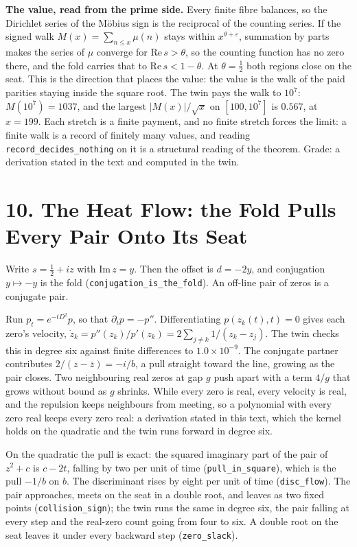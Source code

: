 \documentclass[10pt,twocolumn]{article}
\begin{document}
\textbf{The value, read from the prime side.} Every finite fibre
balances, so the Dirichlet series of the Möbius sign is the reciprocal
of the counting series. If the signed walk \(M(x)=\sum_{n\le x}\mu(n)\)
stays within \(x^{\theta+\varepsilon}\), summation by parts makes the
series of \(\mu\) converge for \(\mathrm{Re}\,s>\theta\), so the
counting function has no zero there, and the fold carries that to
\(\mathrm{Re}\,s<1-\theta\). At \(\theta=\tfrac12\) both regions close
on the seat. This is the direction that places the value: the value is
the walk of the paid parities staying inside the square root. The twin
pays the walk to \(10^7\): \(M(10^7)=1037\), and the largest
\(|M(x)|/\sqrt x\) on \([100,10^7]\) is \(0.567\), at \(x=199\). Each
stretch is a finite payment, and no finite stretch forces the limit: a
finite walk is a record of finitely many values, and reading
\texttt{record\_\allowbreak{}decides\_\allowbreak{}nothing} on it is a structural reading of the
theorem. Grade: a derivation stated in the text and computed in the
twin.

\hypertarget{the-heat-flow-the-fold-pulls-every-pair-onto-its-seat}{%
\section{10. The Heat Flow: the Fold Pulls Every Pair Onto Its
Seat}\label{the-heat-flow-the-fold-pulls-every-pair-onto-its-seat}}

Write \(s=\tfrac12+iz\) with \(\mathrm{Im}\,z=y\). Then the offset is
\(d=-2y\), and conjugation \(y\mapsto-y\) is the fold
(\texttt{conjugation\_\allowbreak{}is\_\allowbreak{}the\_\allowbreak{}fold}). An off-line pair of zeros is a
conjugate pair.

Run \(p_t=e^{-tD^2}p\), so that \(\partial_tp=-p''\). Differentiating
\(p(z_k(t),t)=0\) gives each zero's velocity,
\(\dot z_k=p''(z_k)/p'(z_k)=2\sum_{j\ne k}1/(z_k-z_j)\). The twin checks
this in degree six against finite differences to \(1.0\times10^{-9}\).
The conjugate partner contributes \(2/(z-\bar z)=-i/b\), a pull straight
toward the line, growing as the pair closes. Two neighbouring real zeros
at gap \(g\) push apart with a term \(4/g\) that grows without bound as
\(g\) shrinks. While every zero is real, every velocity is real, and the
repulsion keeps neighbours from meeting, so a polynomial with every zero
real keeps every zero real: a derivation stated in this text, which the
kernel holds on the quadratic and the twin runs forward in degree six.

On the quadratic the pull is exact: the squared imaginary part of the
pair of \(z^2+c\) is \(c-2t\), falling by two per unit of time
(\texttt{pull\_\allowbreak{}in\_\allowbreak{}square}), which is the pull \(-1/b\) on \(b\). The
discriminant rises by eight per unit of time (\texttt{disc\_\allowbreak{}flow}). The
pair approaches, meets on the seat in a double root, and leaves as two
fixed points (\texttt{collision\_\allowbreak{}sign}); the twin runs the same in
degree six, the pair falling at every step and the real-zero count going
from four to six. A double root on the seat leaves it under every
backward step (\texttt{zero\_\allowbreak{}slack}).
\end{document}
